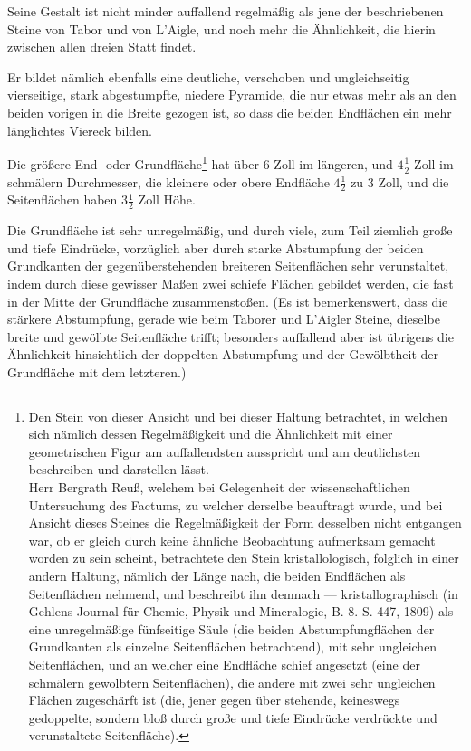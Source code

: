 \documentclass[a4paper, 11pt, oneside, german]{article}
\begin{document}
Seine Gestalt ist nicht minder auffallend regelmäßig als jene der beschriebenen Steine von Tabor und von L'Aigle, und noch mehr die Ähnlichkeit, die hierin zwischen allen dreien Statt findet.

Er bildet nämlich ebenfalls eine deutliche, verschoben und ungleichseitig vierseitige, stark abgestumpfte, niedere Pyramide, die nur etwas mehr als an den beiden vorigen in die Breite gezogen ist, so dass die beiden Endflächen ein mehr länglichtes Viereck bilden.

Die größere End- oder Grundfläche\footnote{Den Stein von dieser Ansicht und bei dieser Haltung betrachtet, in welchen sich nämlich dessen Regelmäßigkeit und die Ähnlichkeit mit einer geometrischen Figur am auffallendsten ausspricht und am deutlichsten beschreiben und darstellen lässt.\\
Herr Bergrath Reuß, welchem bei Gelegenheit der wissenschaftlichen Untersuchung des Factums, zu welcher derselbe beauftragt wurde, und bei Ansicht dieses Steines die Regelmäßigkeit der Form desselben nicht entgangen war, ob er gleich durch keine ähnliche Beobachtung aufmerksam gemacht worden zu sein scheint, betrachtete den Stein kristallologisch, folglich in einer andern Haltung, nämlich der Länge nach, die beiden Endflächen als Seitenflächen nehmend, und beschreibt ihn demnach --- kristallographisch (in Gehlens Journal für Chemie, Physik und Mineralogie, B. 8. S. 447, 1809) als eine unregelmäßige fünfseitige Säule (die beiden Abstumpfungflächen der Grundkanten als einzelne Seitenflächen betrachtend), mit sehr ungleichen Seitenflächen, und an welcher eine Endfläche schief angesetzt (eine der schmälern gewolbtern Seitenflächen), die andere mit zwei sehr ungleichen Flächen zugeschärft ist (die, jener gegen über stehende, keineswegs gedoppelte, sondern bloß durch große und tiefe Eindrücke verdrückte und verunstaltete Seitenfläche).} hat über 6 Zoll im längeren, und $4\frac{1}{2}$ Zoll im schmälern Durchmesser, die kleinere oder obere Endfläche $4\frac{1}{2}$ zu 3 Zoll, und die Seitenflächen haben $3\frac{1}{2}$ Zoll Höhe.

Die Grundfläche ist sehr unregelmäßig, und durch viele, zum Teil ziemlich große und tiefe Eindrücke, vorzüglich aber durch starke Abstumpfung der beiden Grundkanten der gegenüberstehenden breiteren Seitenflächen sehr verunstaltet, indem durch diese gewisser Maßen zwei schiefe Flächen gebildet werden, die fast in der Mitte der Grundfläche zusammenstoßen. (Es ist bemerkenswert, dass die stärkere Abstumpfung, gerade wie beim Taborer und L'Aigler Steine, dieselbe breite und gewölbte Seitenfläche trifft; besonders auffallend aber ist übrigens die Ähnlichkeit hinsichtlich der doppelten Abstumpfung und der Gewölbtheit der Grundfläche mit dem letzteren.)
\end{document}
